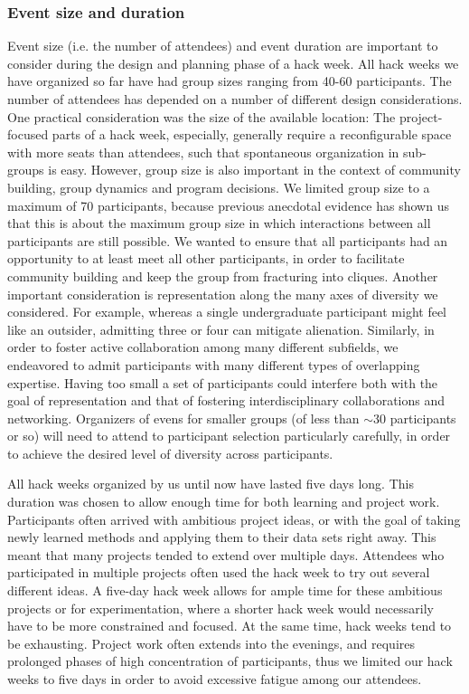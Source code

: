 \documentclass{aastex62}
\begin{document}
\subsubsection{Event size and duration}

Event size (i.e. the number of attendees) and event duration are important to consider during the design and planning phase of a hack week. All hack weeks we have organized so far have had group sizes ranging from 40-60 participants. The number of attendees has depended on a number of different design considerations. One practical consideration was the size of the available location: The project-focused parts of a hack week, especially, generally require a reconfigurable space with more seats than attendees, such that spontaneous organization in sub-groups is easy. However, group size is also important in the context of community building, group dynamics and program decisions. We limited group size to a maximum of 70 participants, because previous anecdotal evidence has shown us that this is about the maximum group size in which interactions between all participants are still possible. We wanted to ensure that all participants had an opportunity to at least meet all other participants, in order to facilitate community building and keep the group from fracturing into cliques. Another important consideration is representation along the many axes of diversity we considered. For example, whereas a single undergraduate participant might feel like an outsider, admitting three or four can mitigate alienation. Similarly, in order to foster active collaboration among many different subfields, we endeavored to admit participants with many different types of overlapping expertise. Having too small a set of participants could interfere both with the goal of representation and that of fostering interdisciplinary collaborations and networking. Organizers of evens for smaller groups (of less than $\sim$30 participants or so) will need to attend to participant selection particularly carefully, in order to achieve the desired level of diversity across participants.

All hack weeks organized by us until now have lasted five days long. This duration was chosen to allow enough time for both learning and project work. Participants often arrived with ambitious project ideas, or with the goal of taking newly learned methods and applying them to their data sets right away. This meant that many projects tended to extend over multiple days. Attendees who participated in multiple projects often used the hack week to try out several different ideas. A five-day hack week allows for ample time for these ambitious projects or for experimentation, where a shorter hack week would necessarily have to be more constrained and focused. At the same time, hack weeks tend to be exhausting. Project work often extends into the evenings, and requires prolonged phases of high concentration of participants, thus we limited our hack weeks to five days in order to avoid excessive fatigue among our attendees.
\end{document}
